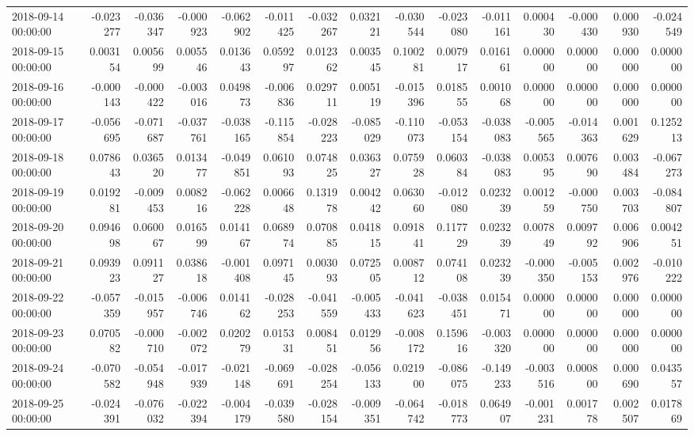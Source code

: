 \begin{tabular}{lrrrrrrrrrrrrrr}
2018-09-14 00:00:00 & -0.023277 & -0.036347 & -0.000923 & -0.062902 & -0.011425 & -0.032267 & 0.032121 & -0.030544 & -0.023080 & -0.011161 & 0.000430 & -0.000430 & 0.000930 & -0.024549 \\
2018-09-15 00:00:00 & 0.003154 & 0.005699 & 0.005546 & 0.013643 & 0.059297 & 0.012362 & 0.003545 & 0.100281 & 0.007917 & 0.016161 & 0.000000 & 0.000000 & 0.000000 & 0.000000 \\
2018-09-16 00:00:00 & -0.000143 & -0.000422 & -0.003016 & 0.049873 & -0.006836 & 0.029711 & 0.005119 & -0.015396 & 0.018555 & 0.001068 & 0.000000 & 0.000000 & 0.000000 & 0.000000 \\
2018-09-17 00:00:00 & -0.056695 & -0.071687 & -0.037761 & -0.038165 & -0.115854 & -0.028223 & -0.085029 & -0.110073 & -0.053154 & -0.038083 & -0.005565 & -0.014363 & 0.001629 & 0.125213 \\
2018-09-18 00:00:00 & 0.078643 & 0.036520 & 0.013477 & -0.049851 & 0.061093 & 0.074825 & 0.036327 & 0.075928 & 0.060384 & -0.038083 & 0.005395 & 0.007690 & 0.003484 & -0.067273 \\
2018-09-19 00:00:00 & 0.019281 & -0.009453 & 0.008216 & -0.062228 & 0.006648 & 0.131978 & 0.004242 & 0.063060 & -0.012080 & 0.023239 & 0.001259 & -0.000750 & 0.003703 & -0.084807 \\
2018-09-20 00:00:00 & 0.094698 & 0.060067 & 0.016599 & 0.014167 & 0.068974 & 0.070885 & 0.041815 & 0.091841 & 0.117729 & 0.023239 & 0.007849 & 0.009792 & 0.006906 & 0.004251 \\
2018-09-21 00:00:00 & 0.093923 & 0.091127 & 0.038618 & -0.001408 & 0.097145 & 0.003093 & 0.072505 & 0.008712 & 0.074108 & 0.023239 & -0.000350 & -0.005153 & 0.002976 & -0.010222 \\
2018-09-22 00:00:00 & -0.057359 & -0.015957 & -0.006746 & 0.014162 & -0.028253 & -0.041559 & -0.005433 & -0.041623 & -0.038451 & 0.015471 & 0.000000 & 0.000000 & 0.000000 & 0.000000 \\
2018-09-23 00:00:00 & 0.070582 & -0.000710 & -0.002072 & 0.020279 & 0.015331 & 0.008451 & 0.012956 & -0.008172 & 0.159616 & -0.003320 & 0.000000 & 0.000000 & 0.000000 & 0.000000 \\
2018-09-24 00:00:00 & -0.070582 & -0.054948 & -0.017939 & -0.021148 & -0.069691 & -0.028254 & -0.056133 & 0.021900 & -0.086075 & -0.149233 & -0.003516 & 0.000800 & 0.000690 & 0.043557 \\
2018-09-25 00:00:00 & -0.024391 & -0.076032 & -0.022394 & -0.004179 & -0.039580 & -0.028154 & -0.009351 & -0.064742 & -0.018773 & 0.064907 & -0.001231 & 0.001778 & 0.002507 & 0.017869 \\

\end{tabular}
